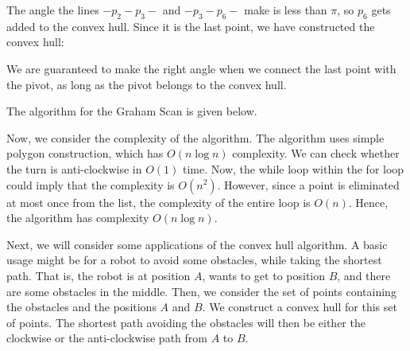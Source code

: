 \documentclass[a4paper, openany]{memoir}
\begin{document}
\noindent The angle the lines $-p_2-p_3-$ and $-p_3-p_6-$ make is less than $\pi$, so $p_6$ gets added to the convex hull. Since it is the last point, we have constructed the convex hull:
\begin{figure}[H]
    \centering
\end{figure}
\noindent We are guaranteed to make the right angle when we connect the last point with the pivot, as long as the pivot belongs to the convex hull.

The algorithm for the Graham Scan is given below.

Now, we consider the complexity of the algorithm. The algorithm uses simple polygon construction, which has $O(n \log n)$ complexity. We can check whether the turn is anti-clockwise in $O(1)$ time. Now, the while loop within the for loop could imply that the complexity is $O(n^2)$. However, since a point is eliminated at most once from the list, the complexity of the entire loop is $O(n)$. Hence, the algorithm has complexity $O(n \log n)$.

Next, we will consider some applications of the convex hull algorithm. A basic usage might be for a robot to avoid some obstacles, while taking the shortest path. That is, the robot is at position $A$, wants to get to position $B$, and there are some obstacles in the middle. Then, we consider the set of points containing the obstacles and the positions $A$ and $B$. We construct a convex hull for this set of points. The shortest path avoiding the obstacles will then be either the clockwise or the anti-clockwise path from $A$ to $B$.
\end{document}
